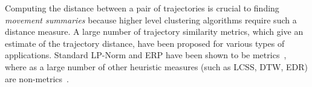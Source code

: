 Computing the distance between a pair of trajectories is crucial to finding \emph{movement summaries} because higher level clustering algorithms require such a distance measure. A large number of trajectory similarity metrics, which give an estimate of the trajectory distance, have been proposed for various types of applications. Standard LP-Norm and ERP have been shown to be metrics~\cite{Chen2004}, where as a large number of other heuristic measures (such as LCSS, DTW, EDR) are non-metrics~\cite{Vlachos2002,Yi1998,Chen2005}. 


